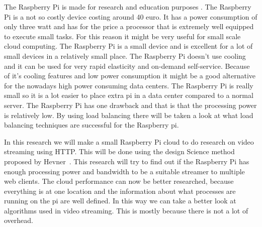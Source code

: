 \documentclass{sig-alternate-br}
\begin{document}
The Raspberry Pi is made for research and education purposes \cite{raspberry-pi}. The Raspberry Pi is a not so costly device costing around 40 euro. It has a power consumption of only three watt and has for the price a processor that is extremely well equipped to execute small tasks. For this reason it might be very useful for small scale cloud computing. The Raspberry Pi is a small device and is excellent for a lot of small devices in a relatively small place. The Raspberry Pi doesn't use cooling and it can be used for very rapid elasticity and on-demand self-service. Because of it's cooling features and low power consumption it might be a good alternative for the nowadays high power consuming data centers. The Raspberry Pi is really small so it is a lot easier to place extra pi in a data center compared to a normal server. The Raspberry Pi has one drawback and that is that the processing power is relatively low. By using load balancing there will be taken a look at what load balancing techniques are successful for the Raspberry pi. 

In this research we will make a small Raspberry Pi cloud to do research on video streaming using HTTP. This will be done using the design Science method proposed by Hevner~\cite{hevner:2007}.  This research will try to find out if the Raspberry Pi has enough processing power and bandwidth to be a suitable streamer to multiple web clients. The cloud performance can now be better researched, because everything is at one location and the information about what processes are running on the pi are well defined. In this way we can take a better look at algorithms used in video streaming. This is mostly because there is not a lot of overhead. 


%
%
\vspace{50 mm}
\newpage
\end{document}
